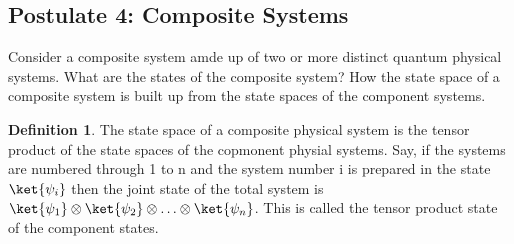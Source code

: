 \documentclass[12pt, oneside]{book}
\theoremstyle{definition}
\newtheorem{definition}{Definition}[section]
\theoremstyle{definition}
\theoremstyle{remark}
\begin{document}
\subsection{Postulate 4: Composite Systems}
Consider a composite system amde up of two or more distinct quantum physical systems.
What are the states of the composite system? How the state space of a composite system is built up from the state spaces of the component 
systems.
\begin{definition}
    The state space of a composite physical system is the tensor product of the state spaces of the copmonent physial systems. Say, 
    if the systems are numbered through 1 to n and the system number i is prepared in the state $\ket{\psi_i}$ then the joint
    state of the total system is $\ket{\psi_1}\otimes\ket{\psi_2}\otimes\ldots\otimes\ket{\psi_n}$. This is called the tensor product state of the component states.    
\end{definition}
\end{document}
